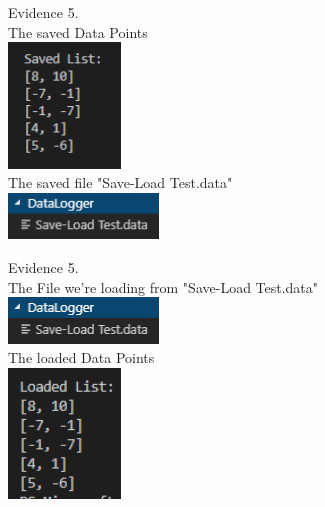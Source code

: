 \begin{flushleft}
\begin{center}
        {\large Evidence 5.\rn } \\ 
        \vspace{0.3cm}
        The saved Data Points \\
        \includegraphics[width=3cm]{Images/Testing/T4.8.1.PNG} \\
        The saved file "Save-Load Test.data" \\
        \includegraphics[width=4cm]{Images/Testing/T4.8.2.PNG} \\
        \vspace{1cm}

        {\large Evidence 5.\rn } \\ 
        \vspace{0.3cm}
        The File we're loading from "Save-Load Test.data" \\
        \includegraphics[width=4cm]{Images/Testing/T4.8.2.PNG} \\
        The loaded Data Points \\
        \includegraphics[width=3cm]{Images/Testing/T4.9.1.PNG} \\
        \vspace{1cm}
    \end{center}
   
\end{flushleft}